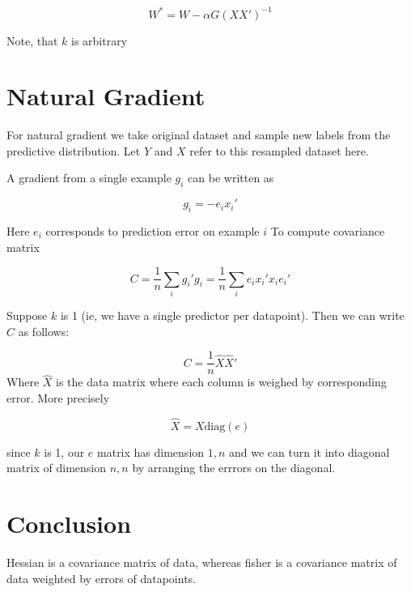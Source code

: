 \documentclass{article}
\begin{document}
$$W^* = W-\alpha G(XX')^{-1}$$

Note, that $k$ is arbitrary

\section{Natural Gradient}

For natural gradient we take original dataset and sample new labels from the predictive distribution. Let $Y$ and $X$ refer to this resampled dataset here.

A gradient from a single example $g_i$ can be written as

$$g_i = -e_i x_i'$$

Here $e_i$ corresponds to prediction error on example $i$
To compute covariance matrix

$$C=\frac{1}{n}\sum_i g_i' g_i = \frac{1}{n}\sum_i e_i x_i'x_ie_i'$$

Suppose $k$ is 1 (ie, we have a single predictor per datapoint). Then we can write $C$ as follows:

$$C=\frac{1}{n}\hat{X}\hat{X}'$$
Where $\hat{X}$ is the data matrix where each column is weighed by corresponding error. More precisely

$$\hat{X}=X \text{diag}(e)$$

since $k$ is 1, our $e$ matrix has dimension $1,n$ and we can turn it into diagonal matrix of dimension $n,n$ by arranging the errrors on the diagonal.

\section{Conclusion}

Hessian is a covariance matrix of data, whereas fisher is a covariance matrix of data weighted by errors of datapoints.
\end{document}
